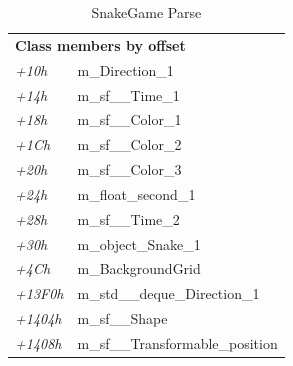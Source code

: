 \documentclass[AutoFakeBold,AutoFakeSlant]{beamer}
\begin{document}
\begin{frame}[fragile]
    \footnotesize
    \begin{table}[htbp] %
        \centering %
        \caption{SnakeGame Parse}
        \begin{tabular}{p{1cm}p{5cm}}
            \toprule
            \multicolumn{2}{l}{\textbf{Class members by offset}} \\
            \emph{+10h  } & m\_Direction\_1                      \\
            \emph{+14h  } & m\_sf\_\_Time\_1                     \\
            \emph{+18h  } & m\_sf\_\_Color\_1                    \\
            \emph{+1Ch  } & m\_sf\_\_Color\_2                    \\
            \emph{+20h  } & m\_sf\_\_Color\_3                    \\
            \emph{+24h  } & m\_float\_second\_1                  \\
            \emph{+28h  } & m\_sf\_\_Time\_2                     \\
            \emph{+30h  } & m\_object\_Snake\_1                  \\
            \emph{+4Ch  } & m\_BackgroundGrid                    \\
            \emph{+13F0h} & m\_std\_\_deque\_Direction\_1        \\
            \emph{+1404h} & m\_sf\_\_Shape                       \\
            \emph{+1408h} & m\_sf\_\_Transformable\_position     \\
            \bottomrule
        \end{tabular}
    \end{table}
\end{frame}
\end{document}
